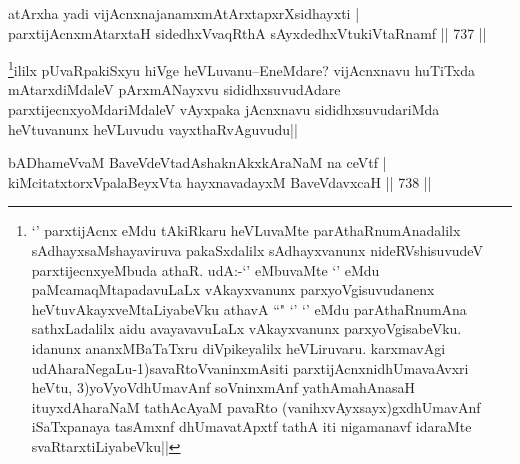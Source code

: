 
\begin{shl}
atArx\s \s ha yadi vijAcnxnajanamxmAtArxtapxrXsidhayxti | \\
parxtijAcnxmAtarxtaH sidedhxVvaqRthA sAyxdedhxVtukiVtaRnamf \hfill||  737 ||  
\end{shl}

\begin{artha}
\footnote{`\stext' parxtijAcnx eMdu tAkiRkaru heVLuvaMte parAthaRnumAnadalilx sAdhayxsaMshayaviruva pakaSxdalilx sAdhayxvanunx nideRVshisuvudeV parxtijecnxyeMbuda athaR. udA:-`\stext' eMbuvaMte `\stext' eMdu paMcamaqMtapadavuLaLx vAkayxvanunx parxyoVgisuvudanenx heVtuvAkayxveMtaLiyabeVku athavA ``\stext" `\stext' `\stext' eMdu parAthaRnumAna sathxLadalilx aidu avayavavuLaLx vAkayxvanunx parxyoVgisabeVku. idanunx ananxMBaTaTxru diVpikeyalilx heVLiruvaru. karxmavAgi udAharaNegaLu-1)savaRtoVvaninxmAsiti parxtijAcnxnidhUmavaAvxri heVtu, 3)yoVyoVdhUmavAnf soV\s ninxmAnf yathAmahAnasaH ituyxdAharaNaM tathAcAyaM pavaRto (vanihxvAyxsayx)gxdhUmavAnf  iSaTxpanaya tasAmxnf dhUmavatApxtf tathA  iti nigamanavf idaraMte svaRtarxtiLiyabeVku||}ililx pUvaRpakiSxyu hiVge heVLuvanu--EneMdare? vijAcnxnavu huTiTxda mAtarxdiMdaleV pArxmANayxvu sididhxsuvudAdare parxtijecnxyoMdariMdaleV vAyxpaka jAcnxnavu sididhxsuvudariMda heVtuvanunx heVLuvudu vayxthaRvAguvudu||
\end{artha}


\begin{shl}
bADhameVvaM BaveVdeVtadAshaknAkxkAraNaM na ceVtf | \\
kiMcitatxtorxVpalaBeyxVta hayxnavadayxM BaveVdavxcaH \hfill||  738 ||  
\end{shl}

